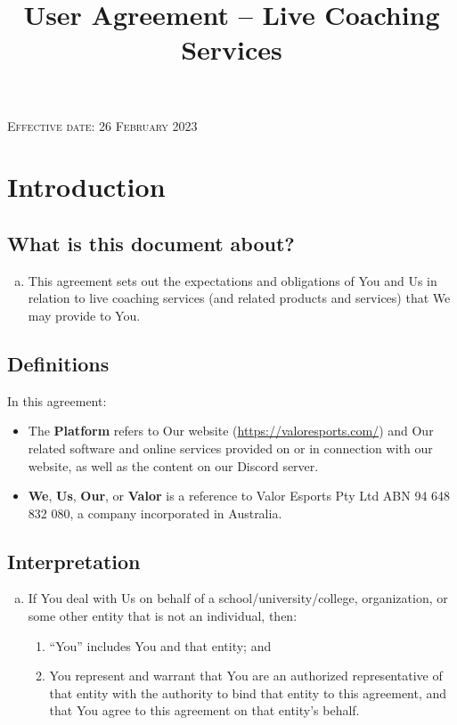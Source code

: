 \documentclass[10pt]{article}
\begin{document}
\title{User Agreement -- Live Coaching Services}

\textsc{Effective date: 26 February 2023}


\section{Introduction}

\subsection{What is this document about?}
\begin{enumerate}[(a)]
\item
This agreement sets out the expectations and obligations of You and Us in relation to live coaching services (and related products and services) that We may provide to You.
\end{enumerate}

\subsection{Definitions}
In this agreement:

\begin{itemize}[label={}]
\item
The \textbf{Platform} refers to Our website (\url{https://valoresports.com/}) and Our related software and online services provided on or in connection with our website, as well as the content on our Discord server.

\item
\textbf{We}, \textbf{Us}, \textbf{Our}, or \textbf{Valor} is a reference to Valor Esports Pty Ltd ABN 94 648 832 080, a company incorporated in Australia.
\end{itemize}

\subsection{Interpretation}
\begin{enumerate}[(a)]
\item
If You deal with Us on behalf of a school/university/college, organization, or some other entity that is not an individual, then:
\begin{enumerate}[(1)]
\item
``You'' includes You and that entity; and

\item
You represent and warrant that You are an authorized representative of that entity with the authority to bind that entity to this agreement, and that You agree to this agreement on that entity’s behalf.
\end{enumerate}
\end{enumerate}
\end{document}
